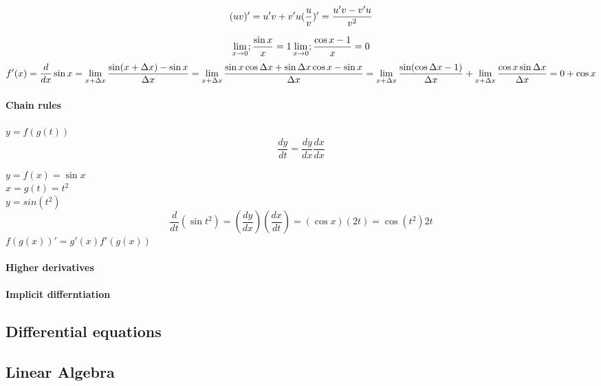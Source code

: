 \documentclass{article}
\begin{document}
                        \[
                            (uv)' = u'v + v'u\\
                            (\frac{u}{v})' = \frac{u'v - v'u}{v^2}
                        \]

                        \[ \lim_{x \to 0}; \frac{\sin x}{x} = 1\\
                            \lim_{x \to 0}; \frac{\cos x -1}{x} = 0
                        \]
                        \[ f'(x) = \frac{d}{dx} \sin x = \lim_{x+\Delta x} \frac{\sin(x+\Delta x) - \sin x}{\Delta x}\\
                        = \lim_{x+\Delta x} \frac{\sin x \cos \Delta x + \sin \Delta x \cos x - \sin x}{\Delta x}
                        = \lim_{x+\Delta x} \frac{\sin(\cos \Delta x -1)}{\Delta x} + \lim_{x+\Delta x} \frac{\cos x \sin \Delta x}{\Delta x}\\
                        = 0 + \cos x
                        \]

                    \paragraph{Chain rules}
                        $ y= f(g(t))$\\
                        \[ \frac{dy}{dt} = \frac{dy}{dx}\frac{dx}{dx} \]

                        $y = f(x) = \sin x$\\
                        $x = g(t) = t^2$\\
                        $y = sin(t^2)$\\
                        \[ \frac{d}{dt}(\sin t^2) = (\frac{dy}{dx})(\frac{dx}{dt})=(\cos x)(2t) = \cos(t^2)2t \]
                        $f(g(x))' = g'(x)f'(g(x))$


                    \paragraph{Higher derivatives}

                    \paragraph{Implicit differntiation}

        \subsection{Differential equations}

        \subsection{Linear Algebra}
\end{document}
